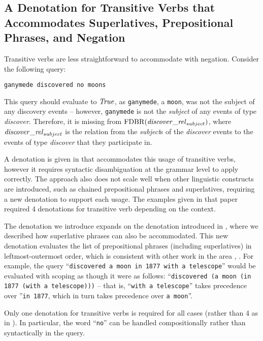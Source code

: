 \documentclass[../main.tex]{subfiles}
\begin{document}
\begin{refsection}
\subsection{A Denotation for Transitive Verbs that Accommodates Superlatives, Prepositional Phrases, and Negation}
\label{subsec:tvs}

Transitive verbs are less straightforward to accommodate with negation.  Consider the following query:
\begin{center}
    \texttt{ganymede discovered no moons}
\end{center}
\noindent This query should evaluate to $\mathit{True}$, as \texttt{ganymede}, a \texttt{moon}, was not the subject of any discovery events -- however, \texttt{ganymede} is not the \textit{subject} of any events of type \textit{discover}.  Therefore, it is missing from $\mathrm{FDBR}({\mathit{discover\_rel}_{subject}})$, where $\mathit{discover\_rel}_{subject}$ is the relation from the \textit{subject}s of the \textit{discover} events to the events of type \textit{discover} that they participate in.

A denotation is given in \cite{frostboulos2002} that accommodates this usage of transitive verbs, however it requires syntactic disambiguation at the grammar level to apply correctly.  The approach also does not scale well when other linguistic constructs are introduced, such as chained prepositional phrases and superlatives, requiring a new denotation to support each usage.  The examples given in that paper required 4 denotations for transitive verb depending on the context.

The denotation we introduce expands on the denotation introduced in \cite{frostpeelar2019}, where we described how superlative phrases can also be accommodated.  This new denotation evaluates the list of prepositional phrases (including superlatives) in leftmost-outermost order, which is consistent with other work in the area \cite{champollion2010quantification}, \cite{ferre2014squall}.  For example, the query ``\texttt{discovered a moon in 1877 with a telescope}'' would be evaluated with scoping as though it were as follows:
``\texttt{discovered (a moon (in 1877 (with a telescope)))} -- that is, ``\texttt{with a telescope}'' takes precedence over ''\texttt{in 1877}, which in turn takes precedence over \texttt{a moon}''.

Only one denotation for transitive verbs is required for all cases (rather than 4 as in \cite{frostboulos2002}). In particular, the word ``\texttt{no}'' can be handled compositionally rather than syntactically in the query.


\end{refsection}
\end{document}
